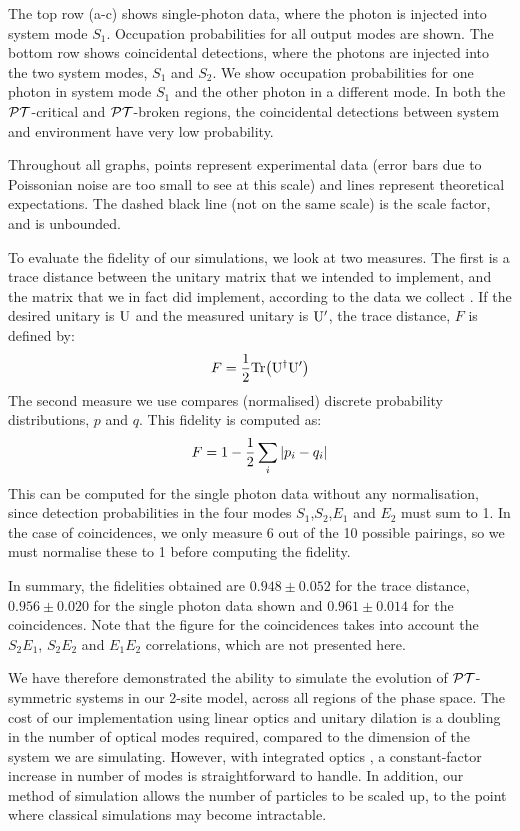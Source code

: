 The top row (a-c) shows single-photon data, where the photon is injected into
system mode \(S_1\). Occupation probabilities for all output modes are shown.
The bottom row shows coincidental detections, where the photons are injected
into the two system modes, \(S_1\) and \(S_2\). We show occupation probabilities
for one photon in system mode \(S_1\) and the other photon in a different mode.
In both the \(\mathcal{PT}\)-critical and \(\mathcal{PT}\)-broken regions, the coincidental
detections between system and environment have very low probability.

Throughout all graphs, points represent experimental data (error bars due to
Poissonian noise are too small to see at this scale) and lines represent
theoretical expectations. The dashed black line (not on the same scale) is the
scale factor, and is unbounded.

To evaluate the fidelity of our simulations, we look at two measures. The first
is a trace distance between the unitary matrix that we intended to implement,
and the matrix that we in fact did implement, according to the data we collect
. If the desired unitary is \(\mathrm{U}\) and the measured unitary
is \(\mathrm{U^{\prime}}\), the trace distance, \(F\) is defined by:
\[F=\frac{1}{2}\mathrm{Tr}\!\left(\mathrm{U}^{\dagger}{\mathrm{U}^{\prime}}\right)\]
The second measure we use compares (normalised) discrete probability
distributions, \(p\) and \(q\). This fidelity is computed as:
\[F=1-\frac{1}{2}\sum_{i}\left|p_{i}-q_{i}\right|\]
This can be computed for the single photon data without any normalisation, since
detection probabilities in the four modes \(S_1\),\(S_2\),\(E_1\) and \(E_2\)
must sum to 1. In the case of coincidences, we only measure 6 out of the 10
possible pairings, so we must normalise these to 1 before computing the
fidelity.

In summary, the fidelities obtained are \(0.948 \pm 0.052\) for the trace
distance, \(0.956 \pm 0.020\) for the single photon data shown and \(0.961 \pm
0.014\) for the coincidences. Note that the figure for the coincidences takes
into account the \(S_2 E_1\), \(S_2 E_2\) and \(E_1 E_2\) correlations, which
are not presented here.

We have therefore demonstrated the ability to simulate the evolution of
\(\mathcal{PT}\)-symmetric systems in our 2-site model, across all regions of the phase
space. The cost of our implementation using linear optics and unitary dilation
is a doubling in the number of optical modes required, compared to the dimension
of the system we are simulating. However, with integrated optics
, a constant-factor increase in number of modes is
straightforward to handle. In addition, our method of simulation allows the
number of particles to be scaled up, to the point where classical simulations
may become intractable.

